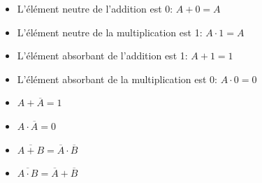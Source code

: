 \begin{easybox}{}
	\begin{itemize}
		\item L'élément neutre de l'addition est 0: $A + 0 = A$
		\item L'élément neutre de la multiplication est 1: $A \cdot 1 = A$
	\end{itemize}
\end{easybox}

\begin{easybox}{}
	\begin{itemize}
		\item L'élément absorbant de l'addition est 1: $A + 1 = 1$
		\item L'élément absorbant de la multiplication est 0: $A \cdot 0 = 0$
	\end{itemize}
\end{easybox}

\begin{easybox}{}
	\begin{itemize}
		\item $A + \overline{A} = 1$
		\item $A \cdot \overline{A} = 0$
	\end{itemize}
\end{easybox}

\begin{propriete}{}
	\begin{itemize}
		\item $\overline{A + B} = \overline{A} \cdot \overline{B}$
		\item $\overline{A \cdot B} = \overline{A} + \overline{B}$
	\end{itemize}
\end{propriete}

